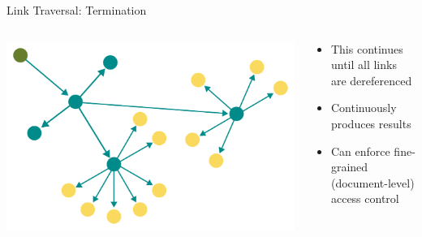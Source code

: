 \begin{frame}{Link Traversal: Termination}
    \begin{columns}[T] %
        \begin{column}{0.6\textwidth} %
            \includegraphics[width=\linewidth]{images/showing-link-traversal-step-3.pdf} %
        \end{column}

        \begin{column}{0.4\textwidth} %
            \begin{itemize}
                \item This continues until all links are dereferenced
                \item Continuously produces results
                \item Can enforce fine-grained (document-level) access control
            \end{itemize}
        \end{column}
    \end{columns}
\end{frame}